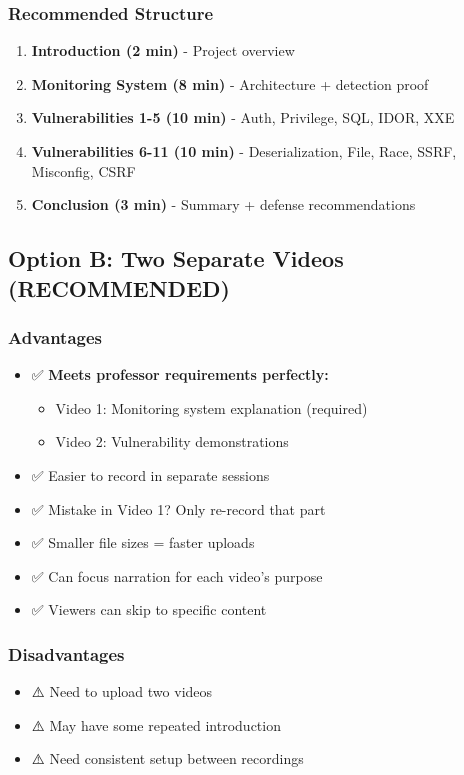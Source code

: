 \documentclass[12pt,a4paper]{article}
\begin{document}
\subsubsection{Recommended Structure}
\begin{enumerate}[leftmargin=*]
    \item \textbf{Introduction (2 min)} - Project overview
    \item \textbf{Monitoring System (8 min)} - Architecture + detection proof
    \item \textbf{Vulnerabilities 1-5 (10 min)} - Auth, Privilege, SQL, IDOR, XXE
    \item \textbf{Vulnerabilities 6-11 (10 min)} - Deserialization, File, Race, SSRF, Misconfig, CSRF
    \item \textbf{Conclusion (3 min)} - Summary + defense recommendations
\end{enumerate}

\subsection{Option B: Two Separate Videos (RECOMMENDED)}

\subsubsection{Advantages}
\begin{itemize}[leftmargin=*]
    \item ✅ \textbf{Meets professor requirements perfectly:}
    \begin{itemize}
        \item Video 1: Monitoring system explanation (required)
        \item Video 2: Vulnerability demonstrations
    \end{itemize}
    \item ✅ Easier to record in separate sessions
    \item ✅ Mistake in Video 1? Only re-record that part
    \item ✅ Smaller file sizes = faster uploads
    \item ✅ Can focus narration for each video's purpose
    \item ✅ Viewers can skip to specific content
\end{itemize}

\subsubsection{Disadvantages}
\begin{itemize}[leftmargin=*]
    \item ⚠️ Need to upload two videos
    \item ⚠️ May have some repeated introduction
    \item ⚠️ Need consistent setup between recordings
\end{itemize}
\end{document}
